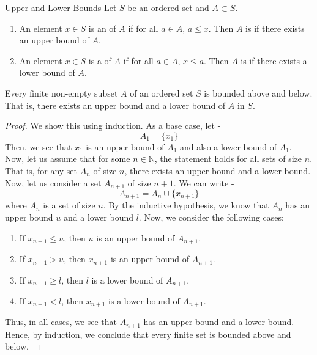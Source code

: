 \documentclass[openany]{book}
\begin{document}
\begin{mydefinition}{Upper and Lower Bounds}
    Let $S$ be an ordered set and $A \subset S$.
    \begin{enumerate}
        \item An element $x \in S$ is an  of $A$ if for all $a \in A$, $a \leq x$. Then $A$ is  if there exists an upper bound of $A$.
        \item An element $x \in S$ is a  of $A$ if for all $a \in A$, $x \leq a$. Then $A$ is  if there exists a lower bound of $A$.
    \end{enumerate}
\end{mydefinition}
\begin{mytheorem}
    Every finite non-empty subset $A$ of an ordered set $S$ is bounded above and below. That is, there exists an upper bound and a lower bound of $A$ in $S$.
\end{mytheorem}
\begin{proof}
We show this using induction. As a base case, let - 
$$A_1 = \{x_1\}$$
Then, we see that $x_1$ is an upper bound of $A_1$ and also a lower bound of $A_1$. Now, let us assume that for some $n \in \mathbb{N}$, the statement holds for all sets of size $n$. That is, for any set $A_n$ of size $n$, there exists an upper bound and a lower bound. Now, let us consider a set $A_{n+1}$ of size $n+1$. We can write -
$$A_{n+1} = A_n \cup \{x_{n+1}\}$$
where $A_n$ is a set of size $n$. By the inductive hypothesis, we know that $A_n$ has an upper bound $u$ and a lower bound $l$. Now, we consider the following cases: 
\begin{enumerate}
    \item If $x_{n+1} \leq u$, then $u$ is an upper bound of $A_{n+1}$.
    \item If $x_{n+1} > u$, then $x_{n+1}$ is an upper bound of $A_{n+1}$.
    \item If $x_{n+1} \geq l$, then $l$ is a lower bound of $A_{n+1}$.
    \item If $x_{n+1} < l$, then $x_{n+1}$ is a lower bound of $A_{n+1}$.
\end{enumerate}
Thus, in all cases, we see that $A_{n+1}$ has an upper bound and a lower bound. Hence, by induction, we conclude that every finite set is bounded above and below. 
\end{proof}
\end{document}

